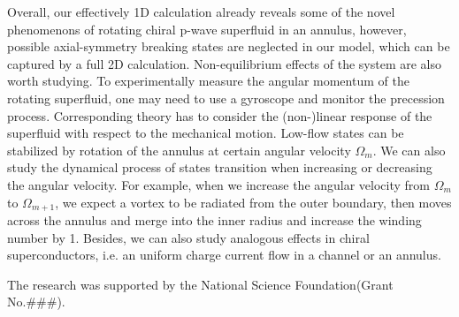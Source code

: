 \documentclass[aps,prb,reprint,groupedaddress]{revtex4-2}
\begin{document}
Overall, our effectively 1D calculation already reveals some of the novel phenomenons
of rotating chiral p-wave superfluid in an annulus, however, possible axial-symmetry
breaking states are neglected in our model, which can be captured by a full 2D calculation.
Non-equilibrium effects of the system are also worth studying. To experimentally
measure the angular momentum of the rotating superfluid, one may need to use a
gyroscope and monitor the precession process. Corresponding theory has to consider the
(non-)linear response of the superfluid with respect to the mechanical motion.
Low-flow states can be stabilized by rotation of the annulus at certain angular velocity
$\Omega_m$. We can also study the dynamical process of states transition when
increasing or decreasing the angular velocity. For example, when we increase the angular
velocity from $\Omega_m$ to $\Omega_{m+1}$,
we expect a vortex to be radiated from the outer boundary, then moves across the annulus
and merge into the inner radius and increase the winding number by 1. Besides, we can
also study analogous effects in chiral superconductors, i.e. an uniform
charge current flow in a channel or an annulus.

\begin{acknowledgments}
    The research was supported by the National Science Foundation(Grant No.\#\#\#).
\end{acknowledgments}

\appendix
\end{document}
